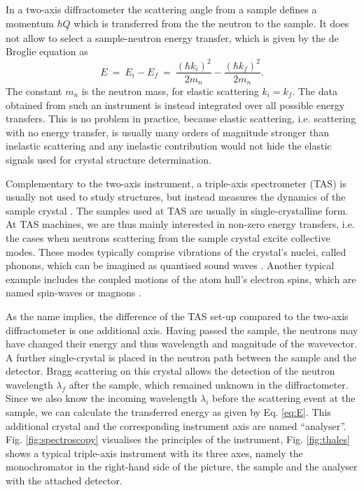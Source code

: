 In a two-axis diffractometer the scattering angle from a sample defines a momentum $\hbar \underline{Q}$ which is
transferred from the the neutron to the sample. It does not allow to select a sample-neutron energy transfer,
which is given by the de Broglie equation as \cite[p. 89]{Gross2012} \cite[p. 11]{Shirane2002}
\begin{equation}
	\label{eq:E}
	E \ =\ E_i - E_f \ =\ \frac{\left( \hbar k_i \right)^2}{2 m_n} - \frac{\left( \hbar k_f \right)^2}{2 m_n}.
\end{equation}
The constant $m_n$ is the neutron mass, for elastic scattering $k_i = k_f$.
The data obtained from such an instrument is instead integrated over all possible energy transfers.
This is no problem in practice, because elastic scattering, i.e. scattering with no energy transfer,
is usually many orders of magnitude stronger than inelastic scattering and any inelastic contribution
would not hide the elastic signals used for crystal structure determination.

Complementary to the two-axis instrument, a triple-axis spectrometer (TAS) is usually not used to study structures,
but instead measures the dynamics of the sample crystal \cite[pp. 214-215]{Gross2012}.
The samples used at TAS are usually in single-crystalline form.
At TAS machines, we are thus mainly interested in non-zero energy transfers, i.e. the cases when neutrons scattering from the
sample crystal excite collective modes. These modes typically comprise vibrations of the crystal's nuclei, called phonons,
which can be imagined as quantised sound waves \cite[pp. 123-137]{Shirane2002}. Another typical example includes the
coupled motions of the atom hull's electron spins, which are named spin-waves or magnons \cite[pp. 137-144]{Shirane2002}.

As the name implies, the difference of the TAS set-up compared to the two-axis diffractometer is one additional axis.
Having passed the sample, the neutrons may have changed their energy and thus wavelength and magnitude of the wavevector.
A further single-crystal is placed in the neutron path between the sample and the detector. Bragg scattering on this crystal
allows the detection of the neutron wavelength $\lambda_f$ after the sample, which remained unknown in the diffractometer.
Since we also know the incoming wavelength $\lambda_i$ before the scattering event at the sample, we can calculate the
transferred energy as given by Eq. \ref{eq:E}. This additional crystal and the corresponding instrument axis are named ``analyser''.
Fig. \ref{fig:spectroscopy} visualises the principles of the instrument, Fig. \ref{fig:thales} shows a typical triple-axis
instrument with its three axes, namely the monochromator in the right-hand side of the picture, the sample and the analyser
with the attached detector.

